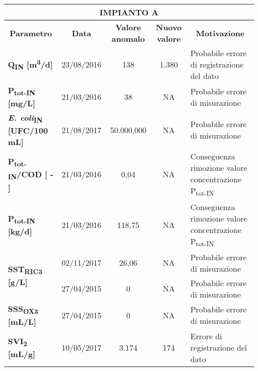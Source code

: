 \begin{sidewaystable}
	\scriptsize
\begin{center}
	\begin{tabular}{|l|c|c|c|l|}
		\hline
		\multicolumn{5}{|c|}{\textbf{IMPIANTO A}}                                                                                                                                  \\ \hline
		\multicolumn{1}{|c|}{\textbf{Parametro}} & \textbf{Data} & \textbf{Valore anomalo} & \textbf{Nuovo valore} & \multicolumn{1}{c|}{\textbf{Motivazione}}                     \\ \hline
		\textbf{Q\textsubscript{IN} {[}m\textsuperscript{3}/d{]}}                  & 23/08/2016    & 138                     & 1.380                 & Probabile errore di registrazione del dato                    \\ \hline
		\textbf{P\textsubscript{tot-IN} {[}mg/L{]}}              & 21/03/2016    & 38                      & NA                    & Probabile errore di misurazione                               \\ \hline
		\textbf{\textit{E. coli}\textsubscript{IN} {[}UFC/100 mL{]}}      & 21/08/2017    & 50.000.000              & NA                    & Probabile errore di misurazione                               \\ \hline
			\textbf{P\textsubscript{tot-IN}/COD [ - ]}              & 21/03/2016    & 0,04                  & NA                    & Conseguenza rimozione valore concentrazione P\textsubscript{tot-IN}              \\ \hline
		\textbf{P\textsubscript{tot-IN} {[}kg/d{]}}              & 21/03/2016    & 118,75                  & NA                    & Conseguenza rimozione valore concentrazione P\textsubscript{tot-IN}              \\ \hline
			\multirow{2}{*}{\textbf{SST\textsubscript{RIC3}
		{[}g/L{]}}}               & 02/11/2017    & 26,06                   & NA                    & Probabile errore di misurazione                               \\ \cline{2-5}
		& 27/04/2015    & 0                   & NA                    & Probabile errore di misurazione                            \\ \hline
		\textbf{SSS\textsubscript{OX3} {[}mL/L{]}}               & 27/04/2015    & 0                       & NA                    & Probabile errore di misurazione                               \\ \hline
		\textbf{SVI\textsubscript{2} {[}mL/g{]}}                 & 10/05/2017    & 3.174                   & 174                    & Errore di registrazione del dato                             \\ \hline
			

\end{tabular}
\end{center}
\end{sidewaystable}
